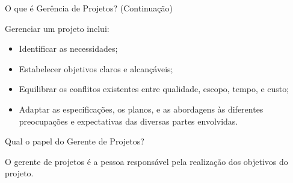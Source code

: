\documentclass[xcolor=x11names,compress]{beamer}
\begin{document}
\begin{frame}{O que é Gerência de Projetos? (Continuação)}

Gerenciar um projeto inclui:

\begin{itemize}
\itemsep 5mm

\item Identificar as necessidades;

\item Estabelecer objetivos claros e alcançáveis;

\item Equilibrar os conflitos existentes entre qualidade, escopo, tempo, e custo;

\item Adaptar as especificações, os planos, e as abordagens às diferentes preocupações e expectativas das diversas partes envolvidas.

\end{itemize}

\end{frame}

\begin{frame}{Qual o papel do Gerente de Projetos?}

\begin{block}{}

O gerente de projetos é a pessoa responsável pela realização dos objetivos do projeto.
\end{block}

\end{frame}
\end{document}
